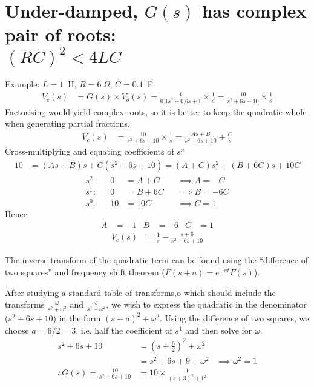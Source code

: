 \documentclass[a4paper,12pt]{article}
\begin{document}
\section*{Under-damped, $G(s)$ has complex pair of roots:\\$(RC)^2<4LC $}
Example: $L=1$~H, $R=6~\Omega$, $C=0.1$~F. %
\begin{align*}
  V_c(s) &= G(s) \times V_o(s)
  = \frac{1}{0.1 s^2 + 0.6 s + 1} \times \frac{1}{s}
  = \frac{10}{s^2 + 6 s + 10} \times \frac{1}{s}
\end{align*}
Factorising would yield complex roots, so it is better to keep the quadratic whole when generating partial fractions.
\begin{align*}
  V_c(s) &= \frac{10}{s^2+6 s + 10} \times \frac{1}{s} = \frac{A s + B}{s^2 + 6 s + 10} + \frac{C}{s}
\end{align*}
Cross-multiplying and equating coefficients of $s^n$
\begin{align*}
  10 &= (As + B)s + C(s^2+6s+10) = (A+C) s^2 + (B+6C) s + 10 C
\end{align*}
\begin{align*}
  s^2: && 0 &= A+C  &&\implies A = -C\\
  s^1: && 0 &= B+6C &&\implies B = -6C\\
  s^0: && 10 &= 10 C && \implies C = 1
\end{align*}
Hence
\begin{align*}
  A &= -1 & B &= -6 & C &= 1
\end{align*}
\begin{align*}
  V_c(s) &= \frac{1}{s} - \frac{s+6}{s^2+6s+10}
\end{align*}


The inverse transform of the quadratic term can be found using
the ``difference of two squares'' and frequency shift theorem
($F(s+a)=e^{-at}F(s)$).

After studying a standard table of transforms,o which should
include the transforms $\frac{\omega}{s^2+\omega^2}$ and
$\frac{s}{s^2+\omega^2}$, we wish to express the quadratic in the
denominator ($s^2+6s+10$) in the form $(s+a)^2+\omega^2$. Using
the difference of two squares, we choose $a=6/2=3$, i.e. half the
coefficient of $s^1$ and then solve for $\omega$.
\begin{align*}
  s^2+6s+10 &= \left(s+\frac{6}{2}\right)^2 + \omega^2 \\
  &= s^2 + 6s + 9 + \omega^2 
  &\implies \omega^2 = 1 \\
  \therefore G(s) = \frac{10}{s^2+6s+10} &= 10 \times \frac{1}{(s+3)^2+1^2}
\end{align*}
\end{document}
